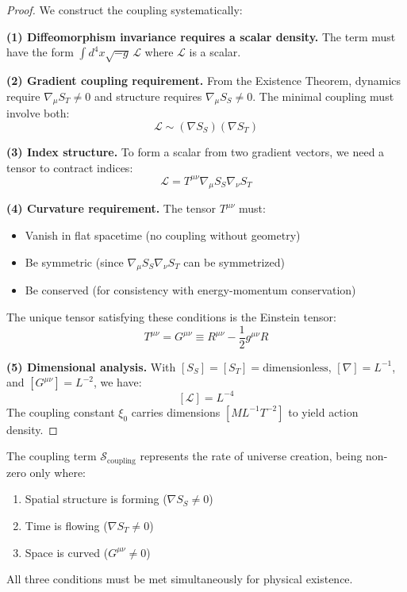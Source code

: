 \documentclass[12pt, a4paper]{article}
\begin{document}
\begin{proof}
We construct the coupling systematically:

\medskip
\noindent\textbf{(1) Diffeomorphism invariance requires a scalar density.}
The term must have the form $\int d^4x \sqrt{-g}\, \mathcal{L}$ where $\mathcal{L}$ 
is a scalar.

\medskip
\noindent\textbf{(2) Gradient coupling requirement.}
From the Existence Theorem, dynamics require $\nabla_\mu S_T \neq 0$ and 
structure requires $\nabla_\mu S_S \neq 0$. The minimal coupling must involve both:
\[
\mathcal{L} \sim (\nabla S_S)(\nabla S_T)
\]

\medskip
\noindent\textbf{(3) Index structure.}
To form a scalar from two gradient vectors, we need a tensor to contract indices:
\[
\mathcal{L} = T^{\mu\nu} \nabla_\mu S_S \nabla_\nu S_T
\]

\medskip
\noindent\textbf{(4) Curvature requirement.}
The tensor $T^{\mu\nu}$ must:
\begin{itemize}
    \item Vanish in flat spacetime (no coupling without geometry)
    \item Be symmetric (since $\nabla_\mu S_S \nabla_\nu S_T$ can be symmetrized)
    \item Be conserved (for consistency with energy-momentum conservation)
\end{itemize}

The unique tensor satisfying these conditions is the Einstein tensor:
\[
T^{\mu\nu} = G^{\mu\nu} \equiv R^{\mu\nu} - \frac{1}{2}g^{\mu\nu}R
\]

\medskip
\noindent\textbf{(5) Dimensional analysis.}
With $[S_S] = [S_T] = \text{dimensionless}$, $[\nabla] = L^{-1}$, 
and $[G^{\mu\nu}] = L^{-2}$, we have:
\[
[\mathcal{L}] = L^{-4}
\]
The coupling constant $\xi_0$ carries dimensions $[ML^{-1}T^{-2}]$ to yield 
action density.
\end{proof}

\begin{theorem}
The coupling term $\mathcal{S}_{\text{coupling}}$ represents the rate of 
universe creation, being non-zero only where:
\begin{enumerate}
    \item Spatial structure is forming ($\nabla S_S \neq 0$)
    \item Time is flowing ($\nabla S_T \neq 0$)  
    \item Space is curved ($G^{\mu\nu} \neq 0$)
\end{enumerate}
All three conditions must be met simultaneously for physical existence.
\end{theorem}
\end{document}
